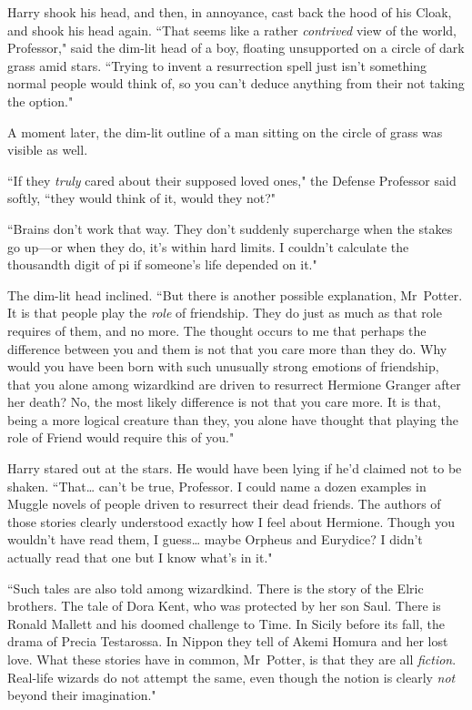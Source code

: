 Harry shook his head, and then, in annoyance, cast back the hood of his Cloak, and shook his head again. ``That seems like a rather \emph{contrived} view of the world, Professor," said the dim-lit head of a boy, floating unsupported on a circle of dark grass amid stars. ``Trying to invent a resurrection spell just isn't something normal people would think of, so you can't deduce anything from their not taking the option."

A moment later, the dim-lit outline of a man sitting on the circle of grass was visible as well.

``If they \emph{truly} cared about their supposed loved ones," the Defense Professor said softly, ``they would think of it, would they not?"

``Brains don't work that way. They don't suddenly supercharge when the stakes go up—or when they do, it's within hard limits. I couldn't calculate the thousandth digit of pi if someone's life depended on it."

The dim-lit head inclined. ``But there is another possible explanation, Mr~Potter. It is that people play the \emph{role} of friendship. They do just as much as that role requires of them, and no more. The thought occurs to me that perhaps the difference between you and them is not that you care more than they do. Why would you have been born with such unusually strong emotions of friendship, that you alone among wizardkind are driven to resurrect Hermione Granger after her death? No, the most likely difference is not that you care more. It is that, being a more logical creature than they, you alone have thought that playing the role of Friend would require this of you."

Harry stared out at the stars. He would have been lying if he'd claimed not to be shaken. ``That{\ldots} can't be true, Professor. I could name a dozen examples in Muggle novels of people driven to resurrect their dead friends. The authors of those stories clearly understood exactly how I feel about Hermione. Though you wouldn't have read them, I guess{\ldots} maybe Orpheus and Eurydice? I didn't actually read that one but I know what's in it."

``Such tales are also told among wizardkind. There is the story of the Elric brothers. The tale of Dora Kent, who was protected by her son Saul. There is Ronald Mallett and his doomed challenge to Time. In Sicily before its fall, the drama of Precia Testarossa. In Nippon they tell of Akemi Homura and her lost love. What these stories have in common, Mr~Potter, is that they are all \emph{fiction}. Real-life wizards do not attempt the same, even though the notion is clearly \emph{not} beyond their imagination."

